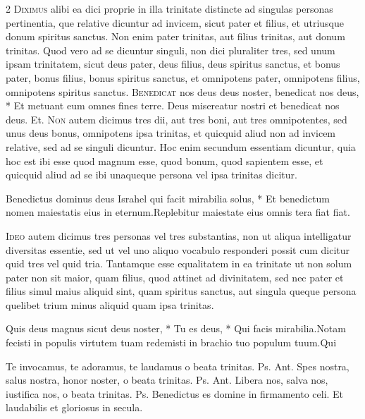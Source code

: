 \begin{multicols*}{2}
\lettrine[lines=2]{\zallmancaps \color{Blue} D}{iximus} alibi ea dici proprie in illa trinitate distincte ad singulas personas pertinentia, que relative dicuntur ad invicem, sicut pater et filius, et utriusque donum spiritus sanctus. Non enim pater trinitas, aut filius trinitas, aut donum trinitas. Quod vero ad se dicuntur singuli, non dici pluraliter tres, sed unum ipsam trinitatem, sicut deus pater, deus filius, deus spiritus sanctus, et bonus pater, bonus filius, bonus spiritus sanctus, et omnipotens pater, omnipotens filius, omnipotens spiritus sanctus. \R
\lettrine[lines=2]{\zallmancaps \color{Red} B}{enedicat} \hypertarget{benedicat-nos-deus}{\label{benedicat-nos-deus}} nos deus deus noster, benedicat nos deus, * Et metuant eum omnes fines terre. \V Deus misereatur nostri et benedicat nos deus. Et.
\lettrine[lines=2]{\zallmancaps \color{Blue} N}{on} autem dicimus tres dii, aut tres boni, aut tres omnipotentes, sed unus deus bonus, omnipotens ipsa trinitas, et quicquid aliud non ad invicem relative, sed ad se singuli dicuntur. Hoc enim secundum essentiam dicuntur, quia hoc est ibi esse quod magnum esse, quod bonum, quod sapientem esse, et quicquid aliud ad se ibi unaqueque persona vel ipsa trinitas dicitur.
\begin{responsory}
{Benedictus dominus deus Israhel qui facit mirabilia solus, * Et benedictum nomen maiestatis eius in eternum.}{Replebitur maiestate eius omnis tera fiat fiat.}
\end{responsory}%
\lettrine[lines=2]{\zallmancaps \color{Red} I}{deo} autem dicimus tres personas vel tres substantias, non ut aliqua intelligatur diversitas essentie, sed ut vel uno aliquo vocabulo responderi possit cum dicitur quid tres vel quid tria. Tantamque esse equalitatem in ea trinitate ut non solum pater non sit maior, quam filius, quod attinet ad divinitatem, sed nec pater et filius simul maius aliquid sint, quam spiritus sanctus, aut singula queque persona quelibet trium minus aliquid quam ipsa trinitas.
\begin{responsory-final}
{Quis deus magnus sicut deus noster, * Tu es deus, * Qui facis mirabilia.}{Notam fecisti in populis virtutem tuam redemisti in brachio tuo populum tuum.}{Qui}
\end{responsory-final}%
 Te invocamus, te adoramus, te laudamus o beata trinitas. {\color{Red} Ps.}  {\color{Red} Ant.} Spes nostra, salus nostra, honor noster, o beata trinitas. {\color{Red} Ps.}  {\color{Red} Ant.} Libera nos, salva nos, iustifica nos, o beata trinitas. {\color{Red} Ps.}  \V Benedictus es domine in firmamento celi. \R Et laudabilis et gloriosus in secula.

\end{multicols*}
